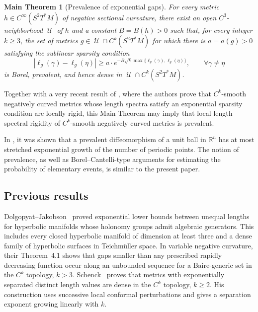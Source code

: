 \documentclass[10pt,oneside,reqno]{amsproc}
\numberwithin{equation}{section}
\newtheorem*{maintheorem}{Main Theorem}
\theoremstyle{definition}
\theoremstyle{remark}
\DeclareMathOperator{\cU}{{\mathscr U}}
\renewcommand{\ge}{\geqslant}
\begin{document}
\bigskip
\bigskip



\begin{maintheorem}[Prevalence of exponential gaps]
\label{thm:prevalence}
For every metric $h \in C^\infty(S^2T^*M)$ of negative sectional curvature, there exist an open $C^3$-neighborhood $\cU$ of $h$ and a constant $B=B(h)>0$ such that, for every integer $k\ge3$, the set of metrics $g\in\cU\cap C^k(S^2T^*M)$ for which there is $a = a(g)>0$ satisfying the \emph{sublinear sparsity condition}
\[
 |\ell_g(\gamma)-\ell_g(\eta)|
 \ge a \cdot e^{-B\sqrt{k}\max\{\ell_g(\gamma),\ell_g(\eta)\}},
 \qquad \forall \gamma\ne\eta
\]
is Borel, prevalent, and hence dense in $\cU\cap C^k(S^2T^*M)$. 
\end{maintheorem}


Together with a very recent result of \cite{DDRO}, where the authors prove that $C^k$-smooth negatively curved metrics whose length spectra satisfy an exponential sparsity condition are locally rigid, this Main Theorem may imply that local length spectral rigidity of $C^k$-smooth negatively curved metrics is prevalent.

In \cite{KH}, it was shown that a prevalent diffeomorphism of a unit ball in $\mathbb R^n$ has at most stretched exponential growth of the number of periodic points. The notion of prevalence, as well as Borel--Cantelli-type arguments for estimating the probability of elementary events, is similar to the present paper.

\subsection*{Previous results}

Dolgopyat--Jakobson~\cite{DJ} proved exponential lower bounds between unequal lengths for hyperbolic manifolds whose holonomy groups admit algebraic generators. This includes every closed hyperbolic manifold of dimension at least three and a dense family of hyperbolic surfaces in Teichm\"uller space. In variable negative curvature, their Theorem~4.1 shows that gaps smaller than any prescribed rapidly
decreasing function occur along an unbounded sequence for a Baire-generic
set in the $C^k$ topology, $k>3$. Schenck~\cite[Theorem~1]{Schenck} proves that metrics with exponentially separated distinct length values are dense in the $C^k$ topology, $k\ge2$. His construction uses successive local conformal perturbations and gives a separation exponent growing linearly with $k$. 
\end{document}
